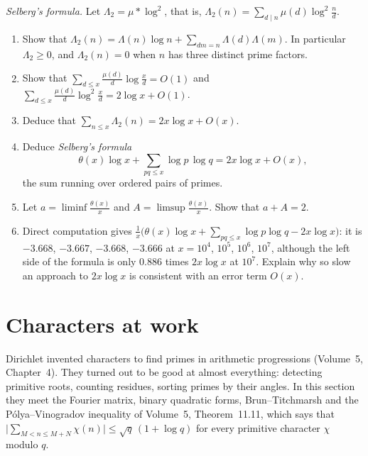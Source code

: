 \begin{exercise}[Journey]\label{pb:selberg}
\emph{Selberg's formula.} Let $\Lambda_2=\mu*\log^2$, that is, $\Lambda_2(n)=\sum_{d\mid n}\mu(d)\log^2\frac nd$.
\begin{enumerate}[label=(\alph*)]
\item Show that $\Lambda_2(n)=\Lambda(n)\log n+\sum_{dm=n}\Lambda(d)\Lambda(m)$. In particular $\Lambda_2\ge0$, and $\Lambda_2(n)=0$ when $n$ has three distinct prime
factors.
\item Show that $\sum_{d\le x}\frac{\mu(d)}d\log\frac xd=O(1)$ and $\sum_{d\le x}\frac{\mu(d)}d\log^2\frac xd=2\log x+O(1)$.
\item Deduce that $\sum_{n\le x}\Lambda_2(n)=2x\log x+O(x)$.
\item Deduce \emph{Selberg's formula}
\[
\theta(x)\log x+\sum_{pq\le x}\log p\,\log q=2x\log x+O(x),
\]
the sum running over ordered pairs of primes.
\item Let $a=\liminf\frac{\theta(x)}x$ and $A=\limsup\frac{\theta(x)}x$. Show that $a+A=2$.
\item Direct computation gives $\frac1x\bigl(\theta(x)\log x+\sum_{pq\le x}\log p\log q-2x\log x\bigr)$: it is $-3.668$, $-3.667$, $-3.668$, $-3.666$ at $x=10^4$, $10^5$,
$10^6$, $10^7$, although the left side of the formula is only $0.886$ times $2x\log x$ at $10^7$. Explain why so slow an approach to $2x\log x$ is consistent with an
error term $O(x)$.
\end{enumerate}
\end{exercise}

\section{Characters at work}

Dirichlet invented characters to find primes in arithmetic progressions (Volume~5, Chapter~4). They turned out to be good at almost everything: detecting primitive
roots, counting residues, sorting primes by their angles. In this section they meet the Fourier matrix, binary quadratic forms, Brun--Titchmarsh and the
Pólya--Vinogradov inequality of Volume~5, Theorem~11.11, which says that $\bigl|\sum_{M<n\le M+N}\chi(n)\bigr|\le\sqrt q\,(1+\log q)$ for every primitive character
$\chi$ modulo $q$.

